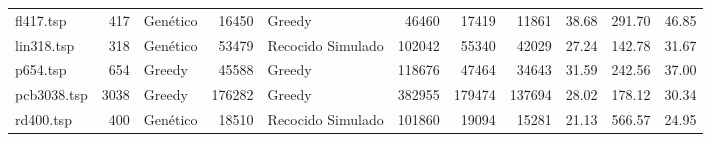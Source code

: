 \begin{table}[hbtp]
{{\begin{tabular}{lrlrlrrrrrr}
\cellcolor[HTML]{C0C0C0}fl417.tsp    & 417                            & Genético                                                                                                                    & 16450                                                                           & Greedy                                                          & 46460                            & 17419                           & 11861                            & 38.68                                   & 291.70                                & 46.85                         \\
\cellcolor[HTML]{C0C0C0}lin318.tsp   & 318                            & Genético                                                                                                                    & 53479                                                                           & Recocido Simulado                                               & 102042                           & 55340                           & 42029                            & 27.24                                   & 142.78                                & 31.67                         \\
\cellcolor[HTML]{C0C0C0}p654.tsp     & 654                            & Greedy                                                                                                                      & 45588                                                                           & Greedy                                                          & 118676                           & 47464                           & 34643                            & 31.59                                   & 242.56                                & 37.00                         \\
\cellcolor[HTML]{C0C0C0}pcb3038.tsp  & 3038                           & Greedy                                                                                                                      & 176282                                                                          & Greedy                                                          & 382955                           & 179474                          & 137694                           & 28.02                                   & 178.12                                & 30.34                         \\
\cellcolor[HTML]{C0C0C0}rd400.tsp    & 400                            & Genético                                                                                                                    & 18510                                                                           & Recocido Simulado                                               & 101860                           & 19094                           & 15281                            & 21.13                                   & 566.57                                & 24.95                         \\

\end{tabular}}}
\end{table}
